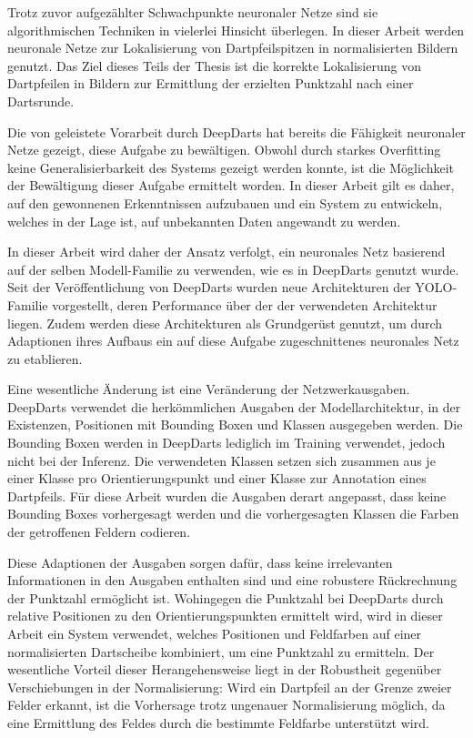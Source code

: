 Trotz zuvor aufgezählter Schwachpunkte neuronaler Netze sind sie algorithmischen Techniken in vielerlei Hinsicht überlegen. In dieser Arbeit werden neuronale Netze zur Lokalisierung von Dartpfeilspitzen in normalisierten Bildern genutzt. Das Ziel dieses Teils der Thesis ist die korrekte Lokalisierung von Dartpfeilen in Bildern zur Ermittlung der erzielten Punktzahl nach einer Dartsrunde.

Die von \citeauthor{deepdarts} geleistete Vorarbeit durch DeepDarts hat bereits die Fähigkeit neuronaler Netze gezeigt, diese Aufgabe zu bewältigen. Obwohl durch starkes Overfitting keine Generalisierbarkeit des Systems gezeigt werden konnte, ist die Möglichkeit der Bewältigung dieser Aufgabe ermittelt worden. In dieser Arbeit gilt es daher, auf den gewonnenen Erkenntnissen aufzubauen und ein System zu entwickeln, welches in der Lage ist, auf unbekannten Daten angewandt zu werden.

In dieser Arbeit wird daher der Ansatz verfolgt, ein neuronales Netz basierend auf der selben Modell-Familie zu verwenden, wie es in DeepDarts genutzt wurde. Seit der Veröffentlichung von DeepDarts \citeyear{deepdarts} wurden neue Architekturen der YOLO-Familie vorgestellt, deren Performance über der der verwendeten Architektur liegen. Zudem werden diese Architekturen als Grundgerüst genutzt, um durch Adaptionen ihres Aufbaus ein auf diese Aufgabe zugeschnittenes neuronales Netz zu etablieren.

Eine wesentliche Änderung ist eine Veränderung der Netzwerkausgaben. DeepDarts verwendet die herkömmlichen Ausgaben der Modellarchitektur, in der Existenzen, Positionen mit Bounding Boxen und Klassen ausgegeben werden. Die Bounding Boxen werden in DeepDarts lediglich im Training verwendet, jedoch nicht bei der Inferenz. Die verwendeten Klassen setzen sich zusammen aus je einer Klasse pro Orientierungspunkt und einer Klasse zur Annotation eines Dartpfeils. Für diese Arbeit wurden die Ausgaben derart angepasst, dass keine Bounding Boxes vorhergesagt werden und die vorhergesagten Klassen die Farben der getroffenen Feldern codieren.

Diese Adaptionen der Ausgaben sorgen dafür, dass keine irrelevanten Informationen in den Ausgaben enthalten sind und eine robustere Rückrechnung der Punktzahl ermöglicht ist. Wohingegen die Punktzahl bei DeepDarts durch relative Positionen zu den Orientierungspunkten ermittelt wird, wird in dieser Arbeit ein System verwendet, welches Positionen und Feldfarben auf einer normalisierten Dartscheibe kombiniert, um eine Punktzahl zu ermitteln. Der wesentliche Vorteil dieser Herangehensweise liegt in der Robustheit gegenüber Verschiebungen in der Normalisierung: Wird ein Dartpfeil an der Grenze zweier Felder erkannt, ist die Vorhersage trotz ungenauer Normalisierung möglich, da eine Ermittlung des Feldes durch die bestimmte Feldfarbe unterstützt wird.

